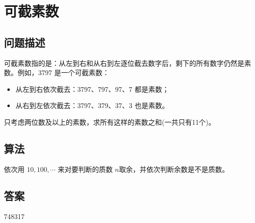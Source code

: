 \section{可截素数}
\subsection{问题描述}
\begin{tcolorbox}

可截素数指的是：从左到右和从右到左逐位截去数字后，剩下的所有数字仍然是素数。例如，3797 是一个可截素数：

\begin{itemize}
    \item 从左到右依次截去：3797、797、97、7 都是素数；
    \item 从右到左依次截去：3797、379、37、3 也是素数。
\end{itemize}

只考虑两位数及以上的素数，求所有这样的素数之和(一共只有11个)。

\end{tcolorbox}

\subsection{算法}

依次用 \( 10, 100, \cdots \) 来对要判断的质数 \( n \)取余，并依次判断余数是不是质数。

\subsection{答案}
748317
